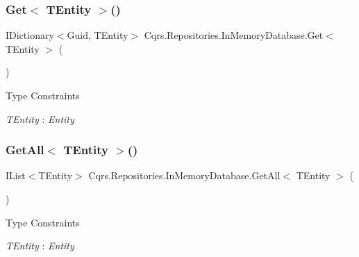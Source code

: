 \subsubsection{\texorpdfstring{Get$<$ T\+Entity $>$()}{Get< TEntity >()}}
{\footnotesize\ttfamily I\+Dictionary$<$Guid, T\+Entity$>$ Cqrs.\+Repositories.\+In\+Memory\+Database.\+Get$<$ T\+Entity $>$ (\begin{DoxyParamCaption}{ }\end{DoxyParamCaption})}

\begin{Desc}
\item[Type Constraints]\begin{description}
\item[{\em T\+Entity} : {\em Entity}]\end{description}
\end{Desc}
\mbox{\label{classCqrs_1_1Repositories_1_1InMemoryDatabase_a83104b325c203f6768bb8ffd2c9c3381_a83104b325c203f6768bb8ffd2c9c3381}} 
\subsubsection{\texorpdfstring{Get\+All$<$ T\+Entity $>$()}{GetAll< TEntity >()}}
{\footnotesize\ttfamily I\+List$<$T\+Entity$>$ Cqrs.\+Repositories.\+In\+Memory\+Database.\+Get\+All$<$ T\+Entity $>$ (\begin{DoxyParamCaption}{ }\end{DoxyParamCaption})}

\begin{Desc}
\item[Type Constraints]\begin{description}
\item[{\em T\+Entity} : {\em Entity}]\end{description}
\end{Desc}
